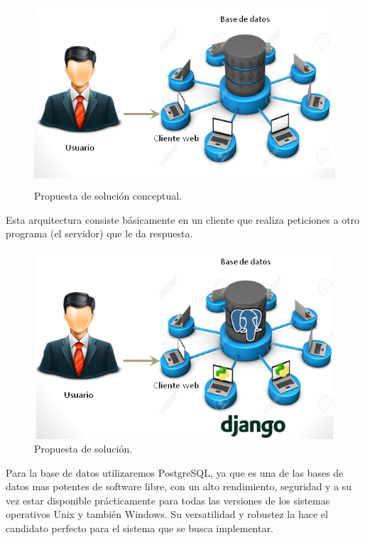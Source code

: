 \begin{figure}[H]
\begin{center}
	\includegraphics[width=15cm,height=7cm]{img/sin_tecnologia1.png}
\end{center}
\caption{Propuesta de solución conceptual.}
\label{fig:Sin_Tec}
\end{figure}

Esta arquitectura consiste básicamente en un cliente que realiza peticiones a otro programa (el servidor) que le da respuesta.

\begin{figure}[H]
\begin{center}
	\includegraphics[width=15cm,height=7cm]{img/con_tecnologia1.png}
\end{center}
\caption{Propuesta de solución.}
\label{fig:Con_Tec}
\end{figure}

Para la base de datos utilizaremos PostgreSQL, ya que es una de las bases de datos mas potentes de software libre, con un alto rendimiento, seguridad y a su vez estar disponible prácticamente para todas las versiones de los sistemas operativos Unix y también Windows. Su versatilidad y robustez la hace el candidato perfecto para el sistema que se busca implementar.

